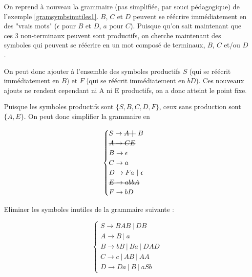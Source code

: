\begin{example}
On reprend à nouveau la grammaire (pas simplifiée, par souci pédagogique) de l'exemple \ref{gramsymbsinutiles1}.
$B$, $C$ et $D$ peuvent se réécrire immédiatement en des "vrais mots" ($\epsilon$ pour $B$ et $D$, $a$ pour $C$). Puisque qu'on sait maintenant que ces $3$ non-terminaux peuvent sont productifs, on cherche maintenant des symboles qui peuvent se réécrire en un mot composé de terminaux, $B$, $C$ et/ou $D$.

On peut donc ajouter à l'ensemble des symboles productifs $S$ (qui se réécrit immédiatement en $B$) et $F$ (qui se réécrit immédiatement en $bD$). Ces nouveaux ajouts ne rendent cependant ni A ni E productifs, on a donc atteint le point fixe.

Puisque les symboles productifs sont $\{S,B,C,D,F\}$, ceux sans production sont $\{A,E\}$. On peut donc simplifier la grammaire en 



\[
\begin{cases}
S \rightarrow \text{\st{$A~|~$}}~B \\
\text{\st{$A \rightarrow CE$}} \\
B \rightarrow \epsilon \\
C \rightarrow a \\
D \rightarrow Fa~|~\epsilon \\
\text{\st{$E \rightarrow abbA$}} \\
F \rightarrow bD
\end{cases}
\]

\end{example}

\begin{exercice}
Eliminer les symboles inutiles de la grammaire suivante :

\[
\begin{cases}
S \rightarrow BAB~|~DB \\
A \rightarrow B~|~a \\
B \rightarrow bB~|~Ba~|~DAD \\
C \rightarrow c~|~AB~|~AA \\
D \rightarrow Da~|~B~|~aSb
\end{cases}
\]

\end{exercice}
